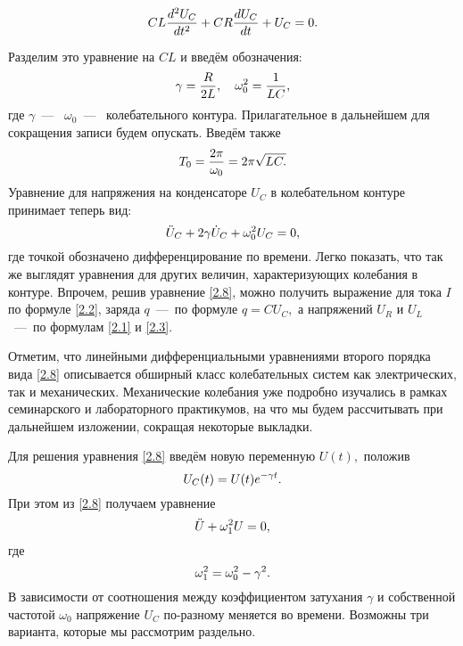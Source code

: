 \begin{equation}
	\eqmark{2.5}
	CL\dfrac{d^2U_C}{dt^2}+CR\dfrac{dU_C}{dt}+U_C=0.
\end{equation}

Разделим это уравнение на $CL$ и введём обозначения:
\begin{equation}\eqmark{2.6}
\gamma=\dfrac{R}{2L},~~~\omega_0^2=\dfrac{1}{LC},
\end{equation}
где $\gamma$~---~ $\omega_0$~---~ колебательного контура. Прилагательное   в дальнейшем для сокращения записи будем опускать. Введём также  
\begin{equation}\eqmark{2.7}
T_0=\dfrac{2\pi}{\omega_0}=2\pi\sqrt{LC.}
\end{equation}
Уравнение для напряжения на конденсаторе $U_C$ в колебательном контуре принимает теперь вид:
\begin{equation}\eqmark{2.8}
\ddot{U}_C+2\gamma\dot{U}_C+\omega_0^2U_C=0,
\end{equation}
где точкой обозначено дифференцирование по времени. Легко показать, что так же выглядят уравнения для других величин, характеризующих колебания в контуре. Впрочем, решив уравнение \eqref{2.8}, можно получить выражение для тока $I$ по формуле \eqref{2.2}, заряда $q$~---~по формуле $q=CU_C,$ а напряжений $U_R$ и $U_L$~---~по формулам \eqref{2.1} и \eqref{2.3}.

Отметим, что линейными дифференциальными уравнениями второго порядка вида \eqref{2.8} описывается обширный класс колебательных систем как электрических, так и механических. Механические колебания уже подробно изучались в рамках семинарского и лабораторного практикумов, на что мы будем рассчитывать при дальнейшем изложении, сокращая некоторые выкладки.

Для решения уравнения \eqref{2.8} введём новую переменную $U(t),$ положив 
\begin{equation}\eqmark{2.9}
U_C(t)=U(t)e^{-\gamma t}.
\end{equation}
При этом из \eqref{2.8} получаем уравнение
\begin{equation}\eqmark{2.10}
\ddot{U}+\omega_1^2U=0,
\end{equation}
где
\begin{equation}\eqmark{2.11}
\omega_1^2=\omega_0^2-\gamma^2.
\end{equation}
В зависимости от соотношения между коэффициентом затухания $\gamma$ и собственной частотой $\omega_0$ напряжение $U_C$ по-разному меняется во времени. Возможны три варианта, которые мы рассмотрим раздельно.

